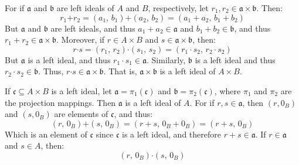 \documentclass[crop=false,class=article]{standalone}                       %
\begin{document}
        \begin{solution}
            For if $\mathfrak{a}$ and $\mathfrak{b}$ are left ideals of
            $A$ and $B$, respectively, let
            $r_{1},r_{2}\in\mathfrak{a}\times\mathfrak{b}$. Then:
            \begin{equation}
                r_{1}\boldsymbol{+}r_{2}
                =(a_{1},\,b_{1})\boldsymbol{+}(a_{2},\,b_{2})
                =(a_{1}+a_{2},\,b_{1}+b_{2})
            \end{equation}
            But $\mathfrak{a}$ and $\mathfrak{b}$ are left ideals, and
            thus $a_{1}+a_{2}\in\mathfrak{a}$ and
            $b_{1}+b_{2}\in\mathfrak{b}$, and thus
            $r_{1}+r_{2}\in\mathfrak{a}\times\mathfrak{b}$. Moreover, if
            $r\in{A}\times{B}$ and $s\in\mathfrak{a}\times\mathfrak{b}$,
            then:
            \begin{equation}
                r\boldsymbol{\cdot}{s}
                =(r_{1},\,r_{2})\boldsymbol{\cdot}(s_{1},\,s_{2})
                =(r_{1}\cdot{s}_{2},\,r_{2}\cdot{s}_{2})
            \end{equation}
            But $\mathfrak{a}$ is a left ideal, and thus
            $r_{1}\cdot{s}_{1}\in\mathfrak{a}$. Similarly, $\mathfrak{b}$
            is a left ideal and thus $r_{2}\cdot{s}_{2}\in\mathfrak{b}$.
            Thus, $r\boldsymbol{\cdot}s\in\mathfrak{a}\times\mathfrak{b}$.
            That is, $\mathfrak{a}\times\mathfrak{b}$ is a left ideal of
            $A\times{B}$.
            \par\hfill\par
            If $\mathfrak{c}\subseteq{A}\times{B}$ is a left ideal,
            let $\mathfrak{a}=\pi_{1}(\mathfrak{c})$ and
            $\mathfrak{b}=\pi_{2}(\mathfrak{c})$, where $\pi_{1}$ and
            $\pi_{2}$ are the projection mappings. Then $\mathfrak{a}$ is
            a left ideal of $A$. For if $r,s\in\mathfrak{a}$, then
            $(r,0_{B})$ and $(s,0_{B})$ are elements of $\mathfrak{c}$,
            and thus:
            \begin{equation}
                (r,\,0_{B})\boldsymbol{+}(s,\,0_{B})
                =(r+s,\,0_{B}+0_{B})
                =(r+s,\,0_{B})
            \end{equation}
            Which is an element of $\mathfrak{c}$ since $\mathfrak{c}$ is
            a left ideal, and therefore $r+s\in\mathfrak{a}$. If
            $r\in\mathfrak{a}$ and $s\in{A}$, then:
            \begin{equation}
                (r,\,0_{B})\boldsymbol{\cdot}(s,\,0_{B})

\end{equation}
\end{solution}
\end{document}
